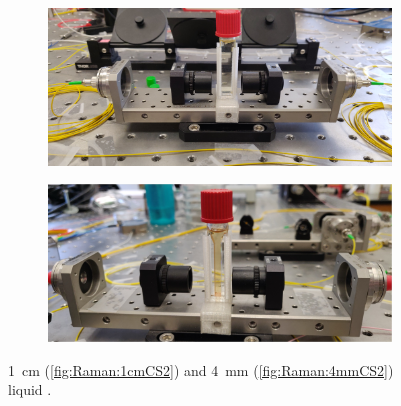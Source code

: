 \begin{table}[h]
    \label{tab:Raman:CS2}
\end{table}

\begin{figure}[t]
    \centering
    \begin{subfigure}[b]{0.49\textwidth}
        \centering
        \includegraphics[width=\textwidth]{figs/4-Raman/1cmCS2.jpeg}
        \caption{}
        \label{fig:Raman:1cmCS2pic}
    \end{subfigure}
    \hfill
    \begin{subfigure}[b]{0.49\textwidth}
        \centering
        \includegraphics[width=\textwidth]{figs/4-Raman/4mmCS2.jpg}
        \caption{}
        \label{fig:Raman:4mmCS2pic}
    \end{subfigure}
    \caption{\SI{1}{\centi\meter} (\ref{fig:Raman:1cmCS2}) and \SI{4}{\milli\meter} (\ref{fig:Raman:4mmCS2}) liquid .}
    \label{fig:Raman:CS2Cuvet}
\end{figure}

